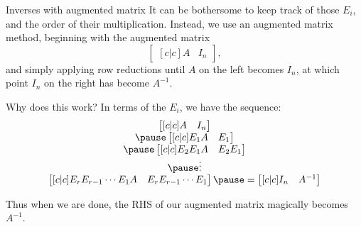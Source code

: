 \begin{frame}{Inverses with augmented matrix}
\footnotesize
It can be bothersome to keep track of those $E_i$, and the order of their multiplication. Instead, we use an augmented matrix method, beginning with the augmented matrix 
\[
\begin{bmatrix}[c|c]
A&I_n\end{bmatrix},
\]
and simply applying row reductions until $A$ on the left becomes $I_n$, at which point $I_n$ on the right has become $A^{-1}$. 

\pause Why does this work? In terms of the $E_i$, we have the sequence:
\[
\begin{array}{c}
\begin{bmatrix}[c|c]
A&I_n\end{bmatrix}
\\
\pause\begin{bmatrix}[c|c]
E_1A&E_1\end{bmatrix}
\\
\pause\begin{bmatrix}[c|c]
E_2E_1A&E_2E_1\end{bmatrix}
\\
\pause\vdots\\
\begin{bmatrix}[c|c]
E_rE_{r-1}\cdots E_1A&E_rE_{r-1}\cdots E_1\end{bmatrix}\pause=\begin{bmatrix}[c|c]I_n&A^{-1}\end{bmatrix}
\end{array}
\]

\pause Thus when we are done, the RHS of our augmented matrix magically becomes $A^{-1}$.
\end{frame}
